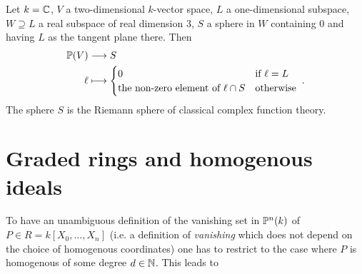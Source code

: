 \documentclass[a4paper,parskip=half,numbers=enddot, DIV=12]{scrreprt}
\begin{document}
\begin{example}
    Let $k=\mathbb{C}$, $V$ a two-dimensional $k$-vector space, $L$ a one-dimensional subspace, $W\supseteq L$ a real subspace of real dimension 3, $S$ a sphere in $W$ containing $0$ and having $L$ as the tangent plane there. Then 
    \begin{align*}
        \IP(V) &\morphism S\\
        \ell &\longmapsto \begin{cases} 0 &\text{if } \ell= L\\
        \text{the non-zero element of }\ell\cap S &\text{otherwise}\end{cases}\;.
    \end{align*}    
    The sphere $S$ is the Riemann sphere of classical complex function theory.
\end{example}


\section{Graded rings and homogenous ideals}

To have an unambiguous definition of the vanishing set in $\mathbb{P}^n(k)$ of $P\in R=k[X_0,\ldots,X_n]$ (i.e. a definition of \emph{vanishing} which does not depend on the choice of homogenous coordinates) one has to restrict to the case where $P$ is homogenous of some degree $d\in\mathbb{N}$. This leads to
\end{document}
